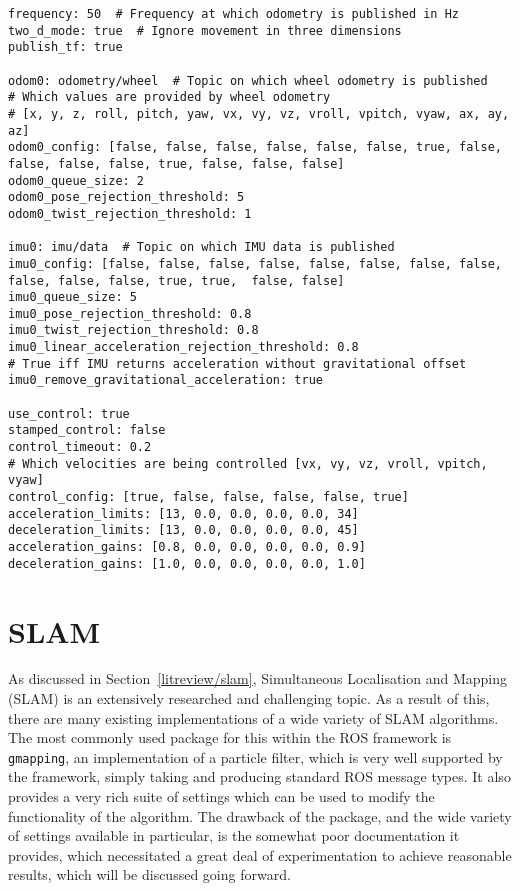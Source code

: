\begin{lstlisting}[caption={EKF YAML file}, label={lst:ekf_yaml}, style=yaml]
frequency: 50  # Frequency at which odometry is published in Hz
two_d_mode: true  # Ignore movement in three dimensions
publish_tf: true

odom0: odometry/wheel  # Topic on which wheel odometry is published
# Which values are provided by wheel odometry
# [x, y, z, roll, pitch, yaw, vx, vy, vz, vroll, vpitch, vyaw, ax, ay, az]
odom0_config: [false, false, false, false, false, false, true, false, false, false, false, true, false, false, false]
odom0_queue_size: 2
odom0_pose_rejection_threshold: 5
odom0_twist_rejection_threshold: 1

imu0: imu/data  # Topic on which IMU data is published
imu0_config: [false, false, false, false, false, false, false, false, false, false, false, true, true,  false, false]
imu0_queue_size: 5
imu0_pose_rejection_threshold: 0.8
imu0_twist_rejection_threshold: 0.8
imu0_linear_acceleration_rejection_threshold: 0.8
# True iff IMU returns acceleration without gravitational offset
imu0_remove_gravitational_acceleration: true

use_control: true
stamped_control: false
control_timeout: 0.2
# Which velocities are being controlled [vx, vy, vz, vroll, vpitch, vyaw]
control_config: [true, false, false, false, false, true]
acceleration_limits: [13, 0.0, 0.0, 0.0, 0.0, 34]
deceleration_limits: [13, 0.0, 0.0, 0.0, 0.0, 45]
acceleration_gains: [0.8, 0.0, 0.0, 0.0, 0.0, 0.9]
deceleration_gains: [1.0, 0.0, 0.0, 0.0, 0.0, 1.0]
\end{lstlisting}





\section{SLAM}\label{soft/SLAM}

As discussed in Section~\ref{litreview/slam}, Simultaneous Localisation and Mapping (SLAM) is an extensively
researched and challenging topic. As a result of this, there are many existing implementations of a wide
variety of SLAM algorithms. The most commonly used package for this within the ROS framework
is \verb|gmapping|, an implementation of a particle filter, which is very well supported by the framework,
simply taking and producing standard ROS message types. It also provides a very rich suite of settings which
can be used to modify the functionality of the algorithm. The drawback of the package, and the wide variety
of settings available in particular, is the somewhat poor documentation it provides, which necessitated a
great deal of experimentation to achieve reasonable results, which will be discussed going forward.

